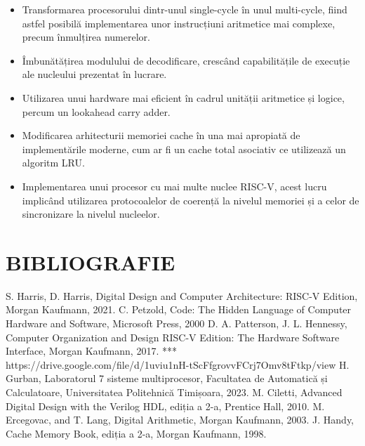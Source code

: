 \documentclass[12pt]{article}
\begin{document}
\begin{itemize}
  \item Transformarea procesorului dintr-unul single-cycle în unul multi-cycle, fiind astfel posibilă implementarea unor instrucțiuni aritmetice mai complexe, precum înmulțirea numerelor.
  \item Îmbunătățirea modulului de decodificare, crescând capabilitățile de execuție ale nucleului prezentat în lucrare.
  \item Utilizarea unui hardware mai eficient în cadrul unității aritmetice și logice, percum un lookahead carry adder.
  \item Modificarea arhitecturii memoriei cache în una mai apropiată de implementările moderne, cum ar fi un cache total asociativ ce utilizează un algoritm LRU.
  \item Implementarea unui procesor cu mai multe nuclee RISC-V, acest lucru implicând utilizarea protocoalelor de coerență la nivelul memoriei  și a celor de sincronizare la nivelul nucleelor.
\end{itemize}

\newpage 
\section*{\centering BIBLIOGRAFIE}
\begin{thebibliography}{0}
S. Harris, D. Harris, Digital Design and Computer Architecture: RISC-V Edition, Morgan Kaufmann, 2021.
C. Petzold, Code: The Hidden Language of Computer Hardware and Software, Microsoft Press, 2000
D. A. Patterson, J. L. Hennessy, Computer Organization and Design RISC-V Edition: The Hardware Software Interface, Morgan Kaufmann, 2017.
*** https://drive.google.com/file/d/1uviu1nH-tScFfgrovvFCrj7Omv8tFtkp/view
H. Gurban, Laboratorul 7 sisteme multiprocesor, Facultatea de Automatică și Calculatoare, Universitatea Politehnică Timișoara, 2023.
M. Ciletti, Advanced Digital Design with the Verilog HDL, ediția a 2-a,
Prentice Hall, 2010.
M. Ercegovac, and T. Lang, Digital Arithmetic, Morgan Kaufmann,
2003.
J. Handy, Cache Memory Book, ediția a 2-a, Morgan Kaufmann, 1998.

\end{thebibliography}
\end{document}
